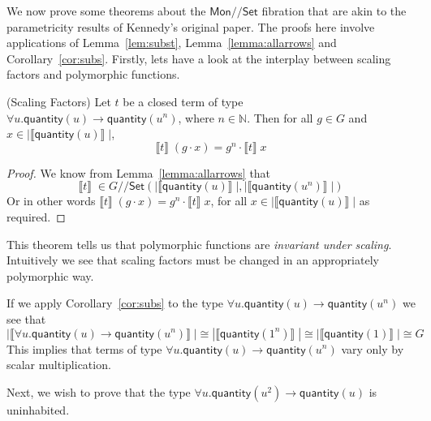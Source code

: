 \documentclass[a4paper,UKenglish]{lipics}
\newcommand{\msf}[1]{\mathsf{#1}} %
\newcommand{\Mon}{\msf{Mon}}
\newcommand{\Set}{\msf{Set}}
\newcommand{\GroupSet}[1]{#1/\!/\Set}
\newcommand{\MonSet}{\GroupSet{\Mon}}
\newcommand{\GSet}{\GroupSet{G}}
\newcommand{\sem}[1]{\ensuremath{\llbracket #1 \rrbracket} \;}
\newcommand{\qnt}{\msf{quantity}}
\begin{document}
We now prove some theorems about the $\MonSet$ fibration that are akin to the parametricity results of Kennedy's original paper. The proofs here involve applications of Lemma~\ref{lem:subst}, Lemma~\ref{lemma:allarrows} and Corollary~\ref{cor:subs}. Firstly, lets have a look at the interplay between scaling factors and polymorphic functions.

\begin{theorem}(Scaling Factors)
\label{thm:ScalFact}
Let $t$ be a closed term of type $\forall u. \qnt(u) \rightarrow \qnt(u^n)$, where $n\in \mathbb{N}$. Then for all $g \in G$ and $x \in |\sem{\qnt(u)}|$,
\[
\sem{t} (g \cdot x) = g^n \cdot \sem{t} x
\]
\end{theorem}
\begin{proof}
We know from Lemma~\ref{lemma:allarrows} that
\[
\sem{t} \in \GSet(|\sem{\qnt(u)}|,|\sem{\qnt(u^n)}|)
\]
Or in other words $\sem{t} (g \cdot x) = g^n \cdot \sem{t} x$, for all $x \in |\sem{\qnt(u)}|$ as required.
\end{proof}
This theorem tells us that polymorphic functions are \emph{invariant under scaling}. Intuitively we see that scaling factors must be changed in an appropriately polymorphic way.

If we apply Corollary~\ref{cor:subs} to the type $\forall u. \qnt(u)\rightarrow \qnt(u^n)$ we see that
\[
 |\sem{\forall u. \qnt(u)\rightarrow \qnt(u^n)}| \cong |\sem{\qnt(1^n)}| \cong |\sem{\qnt(1)}| \cong G
\]
This implies that terms of type $\forall u. \qnt(u)\rightarrow \qnt(u^n)$ vary only by scalar multiplication.


Next, we wish to prove that the type  $\forall u . \qnt(u^2) \rightarrow \qnt(u)$ is uninhabited.
\end{document}
